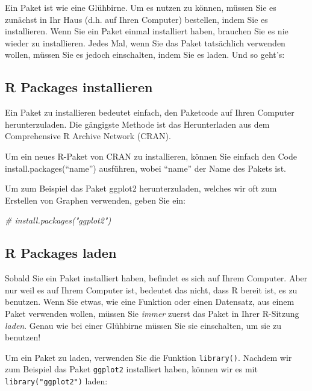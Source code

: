 \documentclass[
]{book}
\newenvironment{Shaded}{\begin{snugshade}}{\end{snugshade}}
\newcommand{\CommentTok}[1]{\textcolor[rgb]{0.56,0.35,0.01}{\textit{#1}}}
\begin{document}
Ein Paket ist wie eine Glühbirne. Um es nutzen zu können, müssen Sie es zunächst in Ihr Haus (d.h. auf Ihren Computer) bestellen, indem Sie es installieren. Wenn Sie ein Paket einmal installiert haben, brauchen Sie es nie wieder zu installieren. Jedes Mal, wenn Sie das Paket tatsächlich verwenden wollen, müssen Sie es jedoch einschalten, indem Sie es laden. Und so geht's:

\hypertarget{r-packages-installieren}{%
\subsection{R Packages installieren}\label{r-packages-installieren}}

Ein Paket zu installieren bedeutet einfach, den Paketcode auf Ihren Computer herunterzuladen. Die gängigste Methode ist das Herunterladen aus dem Comprehensive R Archive Network (CRAN).

Um ein neues R-Paket von CRAN zu installieren, können Sie einfach den Code install.packages(``name'') ausführen, wobei ``name'' der Name des Pakets ist.

Um zum Beispiel das Paket ggplot2 herunterzuladen, welches wir oft zum Erstellen von Graphen verwenden, geben Sie ein:

\begin{Shaded}
\begin{Highlighting}[]
\CommentTok{\# install.packages("ggplot2")}
\end{Highlighting}
\end{Shaded}

\hypertarget{r-packages-laden}{%
\subsection{R Packages laden}\label{r-packages-laden}}

Sobald Sie ein Paket installiert haben, befindet es sich auf Ihrem Computer. Aber nur weil es auf Ihrem Computer ist, bedeutet das nicht, dass R bereit ist, es zu benutzen. Wenn Sie etwas, wie eine Funktion oder einen Datensatz, aus einem Paket verwenden wollen, müssen Sie \emph{immer} zuerst das Paket in Ihrer R-Sitzung \emph{laden}. Genau wie bei einer Glühbirne müssen Sie sie einschalten, um sie zu benutzen!

Um ein Paket zu laden, verwenden Sie die Funktion \texttt{library()}. Nachdem wir zum Beispiel das Paket \texttt{ggplot2} installiert haben, können wir es mit \texttt{library("ggplot2")} laden:
\end{document}
